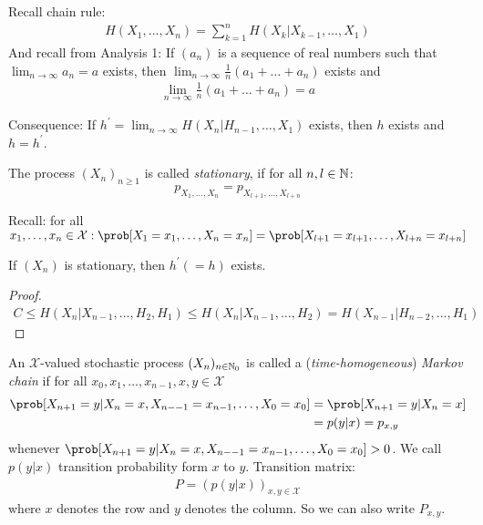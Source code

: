 \documentclass[mfit.tex]{subfiles}
\begin{document}
Recall chain rule:
\begin{align*}
  H(X_1,\dots,X_n) = \sum_{k=1}^n H(X_k|X_{k-1},\dots,X_1)
\end{align*}
And recall from Analysis 1: If $(a_n)$ is a sequence of real numbers such that $\lim_{n \to \infty} a_n = a$ exists, then
$\lim_{n \to \infty} \frac{1}{n} (a_1+\dots+a_n)$ exists and 
\begin{align*}
  \lim_{n \to \infty} \frac{1}{n} (a_1+\dots+a_n) = a
\end{align*}

Consequence: If $h^\prime = \lim_{n \to \infty} H(X_n|H_{n-1},\dots,X_1)$ exists, then $h$ exists and $h = h^\prime$.

\begin{defi*}
  The process $(X_n)_{n \geq 1}$ is called \emph{stationary}, if for all $n,l \in \mathbb{N}$:
  \[ p_{X_1,\dots,X_n} = p_{X_{l+1},\dots,X_{l+n}} \]
\end{defi*}

Recall: for all $x_1,\dots,x_n \in \mathcal{X}: \prob[X_1 = x_1,\dots,X_n = x_n] = \prob[X_{l+1} = x_{l+1},\dots,X_{l+n} = x_{l+n}]$

\begin{lemma}
  If $(X_n)$ is stationary, then $h^\prime (= h)$ exists.
\end{lemma}

\begin{proof}
  \begin{align*}
    C \leq H(X_n|X_{n-1},\dots,H_2,H_1) \leq H(X_n|X_{n-1},\dots,H_2) = H(X_{n-1}|H_{n-2},\dots,H_1)
  \end{align*}
\end{proof}

\begin{defi*}
  An $\mathcal{X}$-valued stochastic process $(X_n)_{n \in \mathbb{N}_0}$ is called a (\emph{time-homogeneous}) \emph{Markov chain} if
  for all $x_0,x_1,\dots,x_{n-1},x,y \in \mathcal{X}$
  \begin{align*}
    \prob[X_{n+1} = y| X_n = x,X_{n--1} = x_{n-1},\dots,X_0 = x_0] &= \prob[X_{n+1} = y|X_n=x] \\
    &= p(y|x) = p_{x,y}
  \end{align*}
  whenever $\prob[X_{n+1} = y| X_n = x,X_{n--1} = x_{n-1},\dots,X_0 = x_0] > 0$.
  We call $p(y|x)$ transition probability form $x$ to $y$.
  Transition matrix:
  \begin{align*}
    P = \left( p(y|x) \right)_{x,y \in \mathcal{X}}
  \end{align*}
  where $x$ denotes the row and $y$ denotes the column. So we can also write $P_{x,y}$.
\end{defi*}
\end{document}
